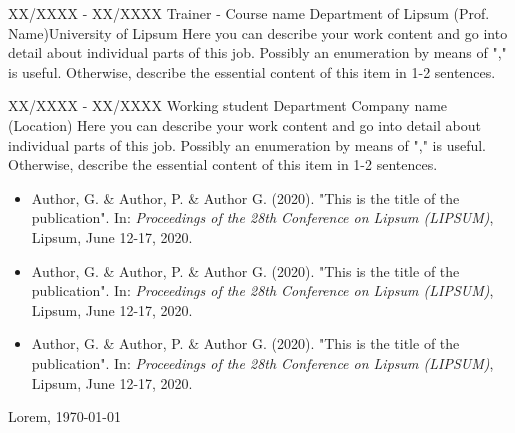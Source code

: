 \begin{paracol}{2}
\begin{rightcolumn}
	\cvevent
	{XX/XXXX - XX/XXXX}
		{Trainer - Course name}
		{Department of Lipsum (Prof. Name)\newline University of Lipsum}
		{Here you can describe your work content and go into detail about individual parts of this job. Possibly an enumeration by means of "," is useful. Otherwise, describe the essential content of this item in 1-2 sentences.}
		\vfill\null



	\cvevent
	{XX/XXXX - XX/XXXX}
		{Working student}
		{Department \newline Company name (Location)}
		{Here you can describe your work content and go into detail about individual parts of this job. Possibly an enumeration by means of "," is useful. Otherwise, describe the essential content of this item in 1-2 sentences.}
		\vfill\null



	\begin{itemize}[leftmargin=*]
	\item Author, G. \& Author, P. \&  Author G. (2020). "This is the title of the publication". In: \textit{Proceedings of the 28th Conference on Lipsum (LIPSUM)}, Lipsum, June 12-17, 2020.
	\item Author, G. \& Author, P. \&  Author G. (2020). "This is the title of the publication". In: \textit{Proceedings of the 28th Conference on Lipsum (LIPSUM)}, Lipsum, June 12-17, 2020.
	\item Author, G. \& Author, P. \&  Author G. (2020). "This is the title of the publication". In: \textit{Proceedings of the 28th Conference on Lipsum (LIPSUM)}, Lipsum, June 12-17, 2020.
	\end{itemize}
	\mbox{}
	\vfill
	\mbox{}
	\vfill
	\mbox{}
	\vfill
	\mbox{}
	\vfill
	\mbox{}
	\vfill
	\mbox{}
	\vfill
	\mbox{}


	Lorem, \today     \hspace{1cm}   \hrulefill

	\hspace*{30mm}\phantom{Lorem, \today }\name

	\end{rightcolumn}
\end{paracol}


